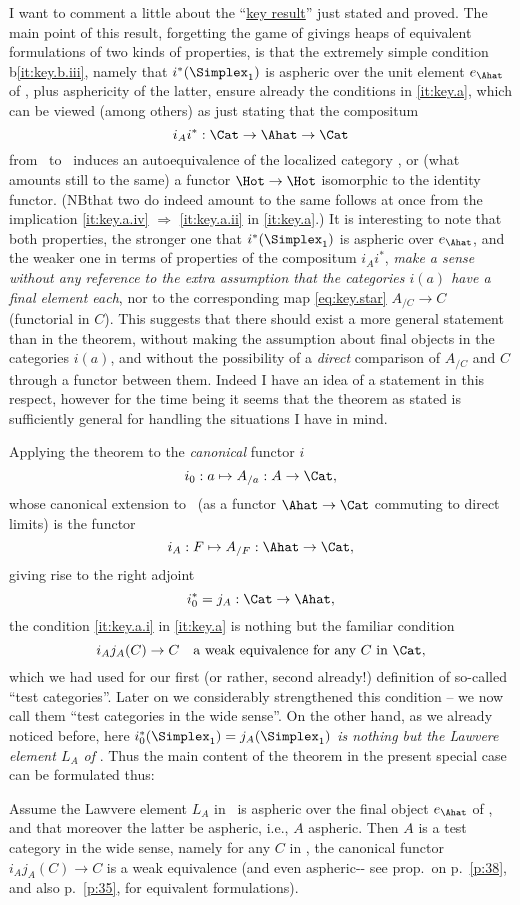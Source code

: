 I want to comment a little about the ``\hyperref[thm:keyresult]{key
  result}'' just stated and proved. The main point of this result,
forgetting the game of givings heaps of equivalent formulations of two
kinds of properties, is that the extremely simple condition
b\ref{it:key.b.iii}, namely that $i^*(\Simplex_1)$ is aspheric over the
unit element $e_\Ahat$ of \Ahat, plus asphericity of the latter,
ensure already the conditions in \ref{it:key.a}, which can be viewed
(among others) as just stating that the compositum
\[ i_Ai^* : \Cat\to\Ahat\to\Cat\]
from \Cat\ to \Cat\ induces an autoequivalence of the localized
category \Hot, or (what amounts still to the same) a functor
$\Hot\to\Hot$ isomorphic to the identity functor. (NB\enspace that two do
indeed amount to the same follows at once from the implication
\ref{it:key.a.iv} $\Rightarrow$ \ref{it:key.a.ii} in \ref{it:key.a}.)
It is interesting to note that both properties, the stronger one that
$i^*(\Simplex_1)$ is aspheric over $e_\Ahat$, and the weaker one in
terms of properties of the compositum $i_Ai^*$, \emph{make a sense without
any reference to the extra assumption that the categories $i(a)$ have
a final element each}, nor to the corresponding map \eqref{eq:key.star}
$A_{/C}\to C$ (functorial in $C$). This suggests that there should exist a more general statement than in
the theorem, without making the assumption about final objects in the
categories $i(a)$, and without the possibility of a \emph{direct}
comparison of $A_{/C}$ and $C$ through a functor between them. Indeed
I have an idea of a statement in this respect, however for the time
being it seems that the theorem as stated is sufficiently general for
handling the situations I have in mind.

Applying the theorem to the \emph{canonical} functor $i$
\[i_0 : a\mapsto A_{/a} : A \to \Cat,\]
whose canonical extension to \Ahat\ (as a functor $\Ahat\to\Cat$
commuting to direct limits) is the functor
\[i_A: F \mapsto A_{/F} : \Ahat\to\Cat,\]
giving rise to the right adjoint
\[i_0^* = j_A : \Cat\to\Ahat,\]
the condition \ref{it:key.a.i} in \ref{it:key.a} is nothing but the
familiar condition
\[ i_Aj_A(C)\to C\quad\text{a weak equivalence for any $C$ in \Cat,}\]
which we had used for our first (or rather, second already!)
definition of so-called ``test categories''. Later on we considerably
strengthened this condition -- we now call them ``test categories in
the wide sense''. On the other hand, as we already noticed before,
here $i_0^*(\Simplex_1) = j_A(\Simplex_1)$ \emph{is nothing but the
  Lawvere element $L_A$ of \Ahat}. Thus the main content of
the theorem in the present special case can be
formulated thus:
\begin{corollarynum}\label{cor:38.1}
  Assume the Lawvere element $L_A$ in \Ahat\ is aspheric over the
  final object $e_\Ahat$ of \Ahat, and that moreover the latter be
  aspheric, i.e., $A$ aspheric. Then $A$ is a test category in the
  wide sense, namely for any $C$ in \Cat, the canonical functor
  $i_Aj_A(C)\to C$ is a weak equivalence \textup(and even
  aspheric\textup -- see prop.\ on p.~\ref{p:38}, and
  also p.~\ref{p:35}, for equivalent formulations).
\end{corollarynum}

